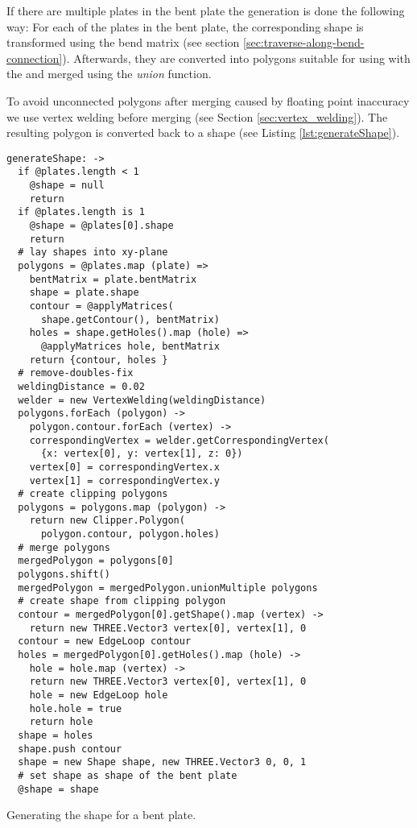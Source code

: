 \documentclass[../ClassicThesis.tex]{subfiles}
\begin{document}
If there are multiple plates in the bent plate the generation is done the following way: For each of the plates in the bent plate, the corresponding shape is transformed using the bend matrix (see section \ref{sec:traverse-along-bend-connection}). Afterwards, they are converted into polygons suitable for using with the \jsclipper{} and merged using the \emph{union} function.

To avoid unconnected polygons after merging caused by floating point inaccuracy we use vertex welding before merging (see Section \ref{sec:vertex_welding}). The resulting polygon is converted back to a shape (see Listing \ref{lst:generateShape}).

\begin{listing}[ht]
\begin{verbatim}
generateShape: ->
  if @plates.length < 1
    @shape = null
    return
  if @plates.length is 1
    @shape = @plates[0].shape
    return
  # lay shapes into xy-plane
  polygons = @plates.map (plate) =>
    bentMatrix = plate.bentMatrix
    shape = plate.shape
    contour = @applyMatrices(
      shape.getContour(), bentMatrix)
    holes = shape.getHoles().map (hole) =>
      @applyMatrices hole, bentMatrix
    return {contour, holes }
  # remove-doubles-fix
  weldingDistance = 0.02
  welder = new VertexWelding(weldingDistance)
  polygons.forEach (polygon) ->
    polygon.contour.forEach (vertex) ->
    correspondingVertex = welder.getCorrespondingVertex(
      {x: vertex[0], y: vertex[1], z: 0})
    vertex[0] = correspondingVertex.x
    vertex[1] = correspondingVertex.y
  # create clipping polygons
  polygons = polygons.map (polygon) ->
    return new Clipper.Polygon(
      polygon.contour, polygon.holes)
  # merge polygons
  mergedPolygon = polygons[0]
  polygons.shift()
  mergedPolygon = mergedPolygon.unionMultiple polygons
  # create shape from clipping polygon
  contour = mergedPolygon[0].getShape().map (vertex) ->
    return new THREE.Vector3 vertex[0], vertex[1], 0
  contour = new EdgeLoop contour
  holes = mergedPolygon[0].getHoles().map (hole) ->
    hole = hole.map (vertex) ->
    return new THREE.Vector3 vertex[0], vertex[1], 0
    hole = new EdgeLoop hole
    hole.hole = true
    return hole
  shape = holes
  shape.push contour
  shape = new Shape shape, new THREE.Vector3 0, 0, 1
  # set shape as shape of the bent plate
  @shape = shape
\end{verbatim}
\caption{Generating the shape for a bent plate.}
\label{lst:generateShape}
\end{listing}
\end{document}

